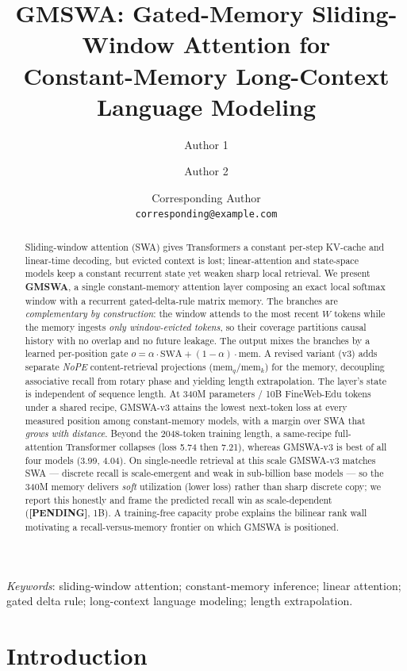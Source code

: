 \documentclass[11pt]{article}
\title{GMSWA: Gated-Memory Sliding-Window Attention for\\
Constant-Memory Long-Context Language Modeling}
\author{Author 1 \and Author 2 \and Corresponding Author\\
\texttt{corresponding@example.com}}
\date{}
\newcommand{\pending}{\textbf{[PENDING]}}
\begin{document}
\maketitle

\begin{abstract}
Sliding-window attention (SWA) gives Transformers a constant per-step KV-cache and
linear-time decoding, but evicted context is lost; linear-attention and state-space
models keep a constant recurrent state yet weaken sharp local retrieval. We present
\textbf{GMSWA}, a single constant-memory attention layer composing an exact local
softmax window with a recurrent gated-delta-rule matrix memory. The branches are
\emph{complementary by construction}: the window attends to the most recent $W$
tokens while the memory ingests \emph{only window-evicted tokens}, so their coverage
partitions causal history with no overlap and no future leakage. The output mixes the
branches by a learned per-position gate $o=\alpha\cdot\text{SWA}+(1-\alpha)\cdot\text{mem}$.
A revised variant (v3) adds separate \emph{NoPE} content-retrieval projections
($\text{mem}_q/\text{mem}_k$) for the memory, decoupling associative recall from rotary
phase and yielding length extrapolation. The layer's state is independent of sequence
length. At 340M parameters / 10B FineWeb-Edu tokens under a shared recipe, GMSWA-v3
attains the lowest next-token loss at every measured position among constant-memory
models, with a margin over SWA that \emph{grows with distance}. Beyond the 2048-token
training length, a same-recipe full-attention Transformer collapses (loss 5.74 then 7.21),
whereas GMSWA-v3 is best of all four models (3.99, 4.04). On single-needle retrieval at
this scale GMSWA-v3 matches SWA --- discrete recall is scale-emergent and weak in
sub-billion base models --- so the 340M memory delivers \emph{soft} utilization (lower
loss) rather than sharp discrete copy; we report this honestly and frame the predicted
recall win as scale-dependent (\pending, 1B). A training-free capacity probe explains the
bilinear rank wall motivating a recall-versus-memory frontier on which GMSWA is positioned.
\end{abstract}

\noindent\textit{Keywords}: sliding-window attention; constant-memory inference;
linear attention; gated delta rule; long-context language modeling; length extrapolation.

\section{Introduction}
\end{document}
